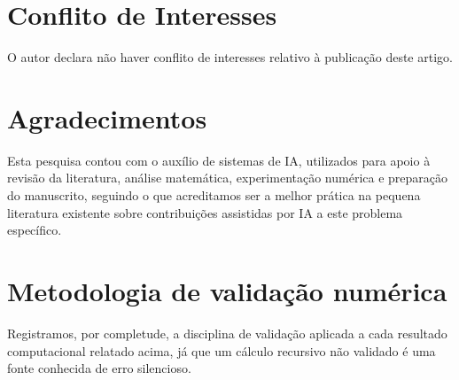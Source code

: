 \documentclass[11pt]{article}
\theoremstyle{definition}
\theoremstyle{remark}
\begin{document}
\section*{Conflito de Interesses}

O autor declara não haver conflito de interesses relativo à publicação
deste artigo.

\section*{Agradecimentos}

Esta pesquisa contou com o auxílio de sistemas de IA, utilizados para
apoio à revisão da literatura, análise matemática, experimentação
numérica e preparação do manuscrito, seguindo o que acreditamos ser a
melhor prática na pequena literatura existente sobre contribuições
assistidas por IA a este problema específico.

\appendix

\section{Metodologia de validação numérica}
\label{app:validation}

Registramos, por completude, a disciplina de validação aplicada a cada
resultado computacional relatado acima, já que um cálculo recursivo
não validado é uma fonte conhecida de erro silencioso.
\end{document}
